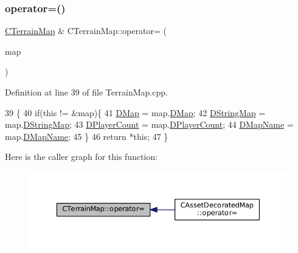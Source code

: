 \subsubsection{\texorpdfstring{operator=()}{operator=()}}
{\footnotesize\ttfamily \hyperlink{classCTerrainMap}{C\+Terrain\+Map} \& C\+Terrain\+Map\+::operator= (\begin{DoxyParamCaption}\item[{const \hyperlink{classCTerrainMap}{C\+Terrain\+Map} \&}]{map }\end{DoxyParamCaption})}



Definition at line 39 of file Terrain\+Map.\+cpp.


\begin{DoxyCode}
39                                                          \{
40     \textcolor{keywordflow}{if}(\textcolor{keyword}{this} != &map)\{
41         \hyperlink{classCTerrainMap_a80d154ce478948b10473534a7bca13f6}{DMap} = map.\hyperlink{classCTerrainMap_a80d154ce478948b10473534a7bca13f6}{DMap};
42         \hyperlink{classCTerrainMap_a76db5fd05e22e0aea413f49175f9c282}{DStringMap} = map.\hyperlink{classCTerrainMap_a76db5fd05e22e0aea413f49175f9c282}{DStringMap};
43         \hyperlink{classCTerrainMap_a79e2cf566ac9dfbaddd2c73ea256785b}{DPlayerCount} = map.\hyperlink{classCTerrainMap_a79e2cf566ac9dfbaddd2c73ea256785b}{DPlayerCount};
44         \hyperlink{classCTerrainMap_a9026e4a5f073885b9e9fc3b43e93caa6}{DMapName} = map.\hyperlink{classCTerrainMap_a9026e4a5f073885b9e9fc3b43e93caa6}{DMapName}; 
45     \}
46     \textcolor{keywordflow}{return} *\textcolor{keyword}{this};
47 \}
\end{DoxyCode}
Here is the caller graph for this function\+:\nopagebreak
\begin{figure}[H]
\begin{center}
\leavevmode
\includegraphics[width=350pt]{classCTerrainMap_ad9f476d5d4db6de2907dfa3d4d9de7e6_icgraph}
\end{center}
\end{figure}
\hypertarget{classCTerrainMap_a7e0e440467a09cb1c59e2bdbec01ccb4}{}\label{classCTerrainMap_a7e0e440467a09cb1c59e2bdbec01ccb4} 
